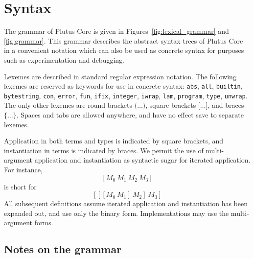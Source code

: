 \documentclass[a4paper]{article}
\begin{document}
\section{Syntax}

The grammar of Plutus Core is given in
Figures~\ref{fig:lexical_grammar} and
\ref{fig:grammar}. This grammar describes the abstract
syntax trees of Plutus Core in a convenient notation which can also be
used as concrete syntax for purposes such as experimentation and
debugging.

Lexemes are described in standard regular expression notation.  The
following lexemes are reserved as keywords for use in concrete syntax:
\texttt{abs}, \texttt{all}, \texttt{builtin}, \texttt{bytestring},
\texttt{con}, \texttt{error}, \texttt{fun}, \texttt{ifix},
\texttt{integer}, \texttt{iwrap}, \texttt{lam}, \texttt{program},
\texttt{type}, \texttt{unwrap}.  The only other lexemes
are round brackets $\texttt{(}\ldots\texttt{)}$, square brackets
$\texttt{[}\ldots\texttt{]}$, and braces
$\texttt{\{}\ldots\texttt{\}}$.  Spaces and tabs are allowed anywhere,
and have no effect save to separate lexemes.

Application in both terms and types is indicated by square
brackets, and instantiation in terms is indicated by braces. We
permit the use of multi-argument application and instantiation as
syntactic sugar for iterated application.
For instance,
\[
  [M_0 ~ M_1 ~ M_2 ~ M_3]
  \]
\noindent is short for
\[
  [[[M_0 ~ M_1] ~ M_2] ~ M_3]
\]
All subsequent definitions assume iterated application and instantiation
has been expanded out, and use only the binary form. Implementations
may use the multi-argument forms.






\newcommand\fixtype[1]{\mu\,\alpha.#1}  %

\subsection{Notes on the grammar}
\end{document}
